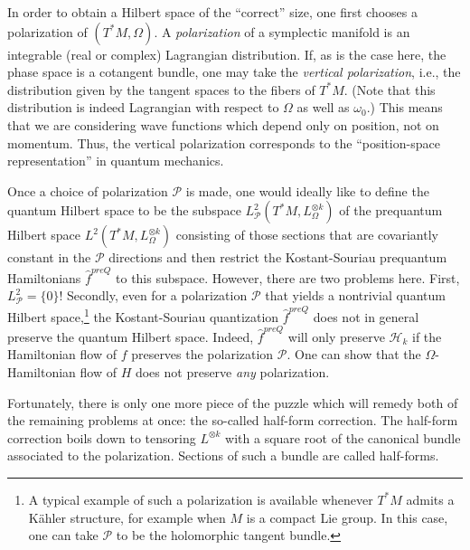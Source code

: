 \documentclass[12pt,leqno]{amsart}%
\theoremstyle{definition}
\theoremstyle{remark}
\numberwithin{equation}{section}
\begin{document}
In order to obtain a Hilbert space of the ``correct'' size, one first
chooses a polarization of $(T^*M,\Omega)$. A \emph{polarization} of a
symplectic manifold is an integrable (real or complex) Lagrangian distribution.
If, as is the case here, the phase space is a cotangent bundle, one may take the
\emph{vertical
polarization}, i.e., the distribution given by the tangent spaces to the fibers
of $T^{\ast}M$. (Note that this distribution is indeed Lagrangian with respect
to $\Omega$ as well as $\omega_0$.)  This means that we are considering wave
functions which depend only
on position, not on momentum. Thus, the vertical polarization corresponds to
the ``position-space representation'' in quantum mechanics.

Once a choice of
polarization $\mathcal{P}$ is made, one would ideally like to define the quantum
Hilbert space to be
the subspace $L^2_\mathcal{P}(T^*M,L_{\Omega}^{\otimes k})$ of the prequantum
Hilbert space $L^2(T^*M,L_{\Omega}^{\otimes k})$ consisting of those sections
that are covariantly constant in the $\mathcal{P}$ directions and then restrict
the Kostant-Souriau prequantum Hamiltonians $\widehat{f}^{preQ}$ to this subspace.
However, there are two problems here.  First, $L^2_\mathcal{P}=\{0\}$!
Secondly, even for
a polarization $\mathcal{P}$ that yields a nontrivial quantum Hilbert
space,\footnote{A
typical example of such a polarization is available whenever $T^*M$ admits a
K\"ahler structure, for example when $M$ is a compact Lie group. In this case,
one can take $\mathcal{P}$ to be the holomorphic tangent bundle.} the
Kostant-Souriau
quantization $\widehat{f}^{preQ}$ does not in
general preserve the quantum Hilbert space. Indeed, $\widehat{f}^{preQ}$ will only
preserve $\mathcal{H}_{k}$ if the Hamiltonian flow of $f$ preserves the
polarization $\mathcal{P}$. One can show that the $\Omega$-Hamiltonian flow of
$H$ does
not preserve \emph{any} polarization.

Fortunately, there is only one
more piece of the puzzle which will remedy both of the remaining problems at
once: the so-called half-form correction. The half-form correction boils down to
tensoring $L^{\otimes k}$ with a square root of the canonical bundle associated
to the polarization. Sections of such a bundle are called half-forms.
\end{document}
